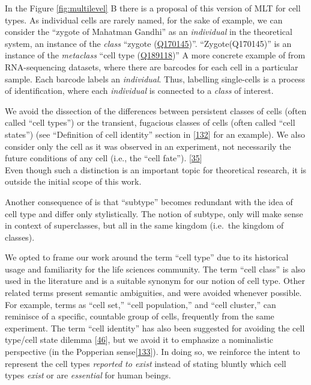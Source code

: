 In the Figure \ref{fig:multilevel} B there is a proposal of this version of MLT for cell types.
As individual cells are rarely named, for the sake of example, we can consider the ``zygote of Mahatman Gandhi'' as an \emph{individual} in the theoretical system, an instance of the \emph{class} ``zygote (\href{https://www.wikidata.org/wiki/Q170145}{Q170145})''.
``Zygote(Q170145)'' is an instance of the \emph{metaclass} ``cell type (\href{https://www.wikidata.org/wiki/Q189118}{Q189118})''
A more concrete example of from RNA-sequencing datasets, where there are barcodes for each cell in a particular sample.
Each barcode labels an \emph{individual}.
Thus, labelling single-cells is a process of identification, where each \emph{individual} is connected to a \emph{class} of interest.

We avoid the dissection of the differences between persistent classes of cells (often called ``cell types'') or the transient, fugacious classes of cells (often called ``cell states'') (see ``Definition of cell identity'' section in {[}\protect\hyperlink{ref-pFijpXkl}{132}{]} for an example). We also consider only the cell as it was observed in an experiment, not necessarily the future conditions of any cell (i.e., the ``cell fate''). {[}\protect\hyperlink{ref-OjxQDZpx}{35}{]}\\
Even though such a distinction is an important topic for theoretical research, it is outside the initial scope of this work.

Another consequence of is that ``subtype'' becomes redundant with the idea of cell type and differ only stylistically.
The notion of subtype, only will make sense in context of superclasses, but all in the same kingdom (i.e.~the kingdom of classes).

We opted to frame our work around the term ``cell type'' due to its historical usage and familiarity for the life sciences community.
The term ``cell class'' is also used in the literature and is a suitable synonym for our notion of cell type.
Other related terms present semantic ambiguities, and were avoided whenever possible.
For example, terms as ``cell set,'' ``cell population,'' and ``cell cluster,'' can reminisce of a specific, countable group of cells, frequently from the same experiment.
The term ``cell identity'' has also been suggested for avoiding the cell type/cell state dilemma {[}\protect\hyperlink{ref-WKbly37M}{46}{]}, but we avoid it to emphasize a nominalistic perspective (in the Popperian sense{[}\protect\hyperlink{ref-1C6LI68h6}{133}{]}).
In doing so, we reinforce the intent to represent the cell types \emph{reported to exist} instead of stating bluntly which cell types \emph{exist} or are \emph{essential} for human beings.

